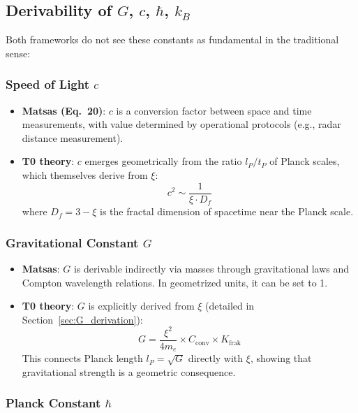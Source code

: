 	\subsection{Derivability of $G$, $c$, $\hbar$, $k_B$}
	
	Both frameworks do not see these constants as fundamental in the traditional sense:
	
	\subsubsection{Speed of Light $c$}
	
	\begin{itemize}
		\item \textbf{Matsas (Eq.~20)}: $c$ is a conversion factor between space and time measurements, with value determined by operational protocols (e.g., radar distance measurement).
		
		\item \textbf{T0 theory}: $c$ emerges geometrically from the ratio $l_P/t_P$ of Planck scales, which themselves derive from $\xi$:
		\[
		c^2 \sim \frac{1}{\xi \cdot D_f}
		\]
		where $D_f = 3 - \xi$ is the fractal dimension of spacetime near the Planck scale.
	\end{itemize}
	
	\subsubsection{Gravitational Constant $G$}
	
	\begin{itemize}
		\item \textbf{Matsas}: $G$ is derivable indirectly via masses through gravitational laws and Compton wavelength relations. In geometrized units, it can be set to 1.
		
		\item \textbf{T0 theory}: $G$ is explicitly derived from $\xi$ (detailed in Section~\ref{sec:G_derivation}):
		\[
		G = \frac{\xi^2}{4 m_e} \times C_{\text{conv}} \times K_{\text{frak}}
		\]
		This connects Planck length $l_P = \sqrt{G}$ directly with $\xi$, showing that gravitational strength is a geometric consequence.
	\end{itemize}
	
	\subsubsection{Planck Constant $\hbar$}
	
